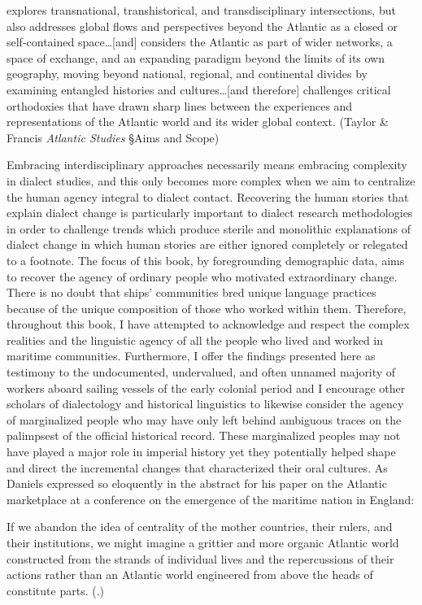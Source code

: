 explores transnational, transhistorical, and transdisciplinary intersections, but also addresses global flows and perspectives beyond the Atlantic as a closed or self-contained space…[and] considers the Atlantic as part of wider networks, a space of exchange, and an expanding paradigm beyond the limits of its own geography, moving beyond national, regional, and continental divides by examining entangled histories and cultures…[and therefore] challenges critical orthodoxies that have drawn sharp lines between the experiences and representations of the Atlantic world and its wider global context. (Taylor \& Francis \citealt{Group2016} \textit{Atlantic Studies} §Aims and Scope)

Embracing interdisciplinary approaches necessarily means embracing complexity in dialect studies, and this only becomes more complex when we aim to centralize the human agency integral to dialect contact. Recovering the human stories that explain dialect change is particularly important to dialect research methodologies in order to challenge trends which produce sterile and monolithic explanations of dialect change in which human stories are either ignored completely or relegated to a footnote. The focus of this book, by foregrounding demographic data, aims to recover the agency of ordinary people who motivated extraordinary change. There is no doubt that ships’ communities bred unique language practices because of the unique composition of those who worked within them. Therefore, throughout this book, I have attempted to acknowledge and respect the complex realities and the linguistic agency of all the people who lived and worked in maritime communities. Furthermore, I offer the findings presented here as testimony to the undocumented, undervalued, and often unnamed majority of workers aboard sailing vessels of the early colonial period and I encourage other scholars of dialectology and historical linguistics to likewise consider the agency of marginalized people who may have only left behind ambiguous traces on the palimpsest of the official historical record. These marginalized peoples may not have played a major role in imperial history yet they potentially helped shape and direct the incremental changes that characterized their oral cultures. As Daniels expressed so eloquently in the abstract for his paper on the Atlantic marketplace at a conference on the emergence of the maritime nation in England:

If we abandon the idea of centrality of the mother countries, their rulers, and their institutions, we might imagine a grittier and more organic Atlantic world constructed from the strands of individual lives and the repercussions of their actions rather than an Atlantic world engineered from above the heads of constitute parts. (\citealt{Daniels2015}.)

